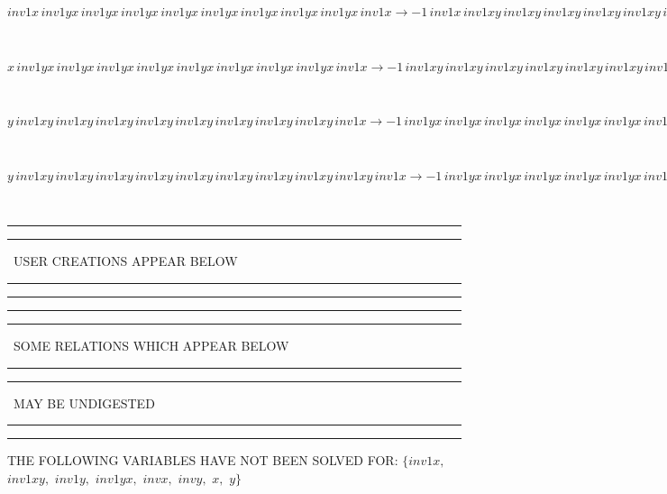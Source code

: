 \documentclass[rep10,leqno]{report}
\begin{document}
\begin{minipage}{6in}
$
inv1x\,
 inv1yx\,
 inv1yx\,
 inv1yx\,
 inv1yx\,
 inv1yx\,
 inv1yx\,
 inv1yx\,
 inv1yx\,
 inv1x\rightarrow -1\,
 inv1x\,
 inv1xy\,
 inv1xy\,
 inv1xy\,
 inv1xy\,
 inv1xy\,
 inv1xy\,
 inv1xy\,
 inv1xy + inv1yx\,
 inv1yx\,
 inv1yx\,
 inv1yx\,
 inv1yx\,
 inv1yx\,
 inv1yx\,
 inv1yx\,
 inv1x + inv1x\,
 inv1xy\,
 inv1xy\,
 inv1xy\,
 inv1xy\,
 inv1xy\,
 inv1xy\,
 inv1xy\,
 inv1xy\,
 inv1x
$
\end{minipage}\medskip \\
\begin{minipage}{6in}
$
x\,
 inv1yx\,
 inv1yx\,
 inv1yx\,
 inv1yx\,
 inv1yx\,
 inv1yx\,
 inv1yx\,
 inv1yx\,
 inv1x\rightarrow -1\,
 inv1xy\,
 inv1xy\,
 inv1xy\,
 inv1xy\,
 inv1xy\,
 inv1xy\,
 inv1xy\,
 inv1xy + inv1xy\,
 inv1xy\,
 inv1xy\,
 inv1xy\,
 inv1xy\,
 inv1xy\,
 inv1xy\,
 inv1xy\,
 inv1x
$
\end{minipage}\medskip \\
\begin{minipage}{6in}
$
y\,
 inv1xy\,
 inv1xy\,
 inv1xy\,
 inv1xy\,
 inv1xy\,
 inv1xy\,
 inv1xy\,
 inv1xy\,
 inv1x\rightarrow -1\,
 inv1yx\,
 inv1yx\,
 inv1yx\,
 inv1yx\,
 inv1yx\,
 inv1yx\,
 inv1yx\,
 inv1x + inv1yx\,
 inv1yx\,
 inv1yx\,
 inv1yx\,
 inv1yx\,
 inv1yx\,
 inv1yx\,
 inv1yx\,
 inv1x + y\,
 inv1xy\,
 inv1xy\,
 inv1xy\,
 inv1xy\,
 inv1xy\,
 inv1xy\,
 inv1xy\,
 inv1xy
$
\end{minipage}\medskip \\
\begin{minipage}{6in}
$
y\,
 inv1xy\,
 inv1xy\,
 inv1xy\,
 inv1xy\,
 inv1xy\,
 inv1xy\,
 inv1xy\,
 inv1xy\,
 inv1xy\,
 inv1x\rightarrow -1\,
 inv1yx\,
 inv1yx\,
 inv1yx\,
 inv1yx\,
 inv1yx\,
 inv1yx\,
 inv1yx\,
 inv1yx\,
 inv1x + inv1yx\,
 inv1yx\,
 inv1yx\,
 inv1yx\,
 inv1yx\,
 inv1yx\,
 inv1yx\,
 inv1yx\,
 inv1yx\,
 inv1x + y\,
 inv1xy\,
 inv1xy\,
 inv1xy\,
 inv1xy\,
 inv1xy\,
 inv1xy\,
 inv1xy\,
 inv1xy\,
 inv1xy
$
\end{minipage}\\
\rule[2pt]{6in}{1pt}\hfil\break
\rule[2.5pt]{1.701in}{1pt}
\ USER CREATIONS APPEAR BELOW\ 
\rule[2.5pt]{1.701in}{1pt}\hfil\break
\rule[2pt]{6in}{1pt}\hfil\break
\rule[2pt]{6in}{4pt}\hfil\break
\rule[2pt]{1.45in}{4pt}
\ SOME RELATIONS WHICH APPEAR BELOW\ 
\rule[2pt]{1.45in}{4pt}\hfil\break
\rule[2pt]{2.18in}{4pt}
\ MAY BE UNDIGESTED\ 
\rule[2pt]{2.18in}{4pt}\hfil\break
\rule[2pt]{6in}{4pt}\hfil\break
THE FOLLOWING VARIABLES HAVE NOT BEEN SOLVED FOR:\hfil\break
$\{inv1x,
$ $
inv1xy,
$ $
inv1y,
$ $
inv1yx,
$ $
invx,
$ $
invy,
$ $
x,
$ $
y\}$
\smallskip\\
\vspace{10pt}
\end{document}
